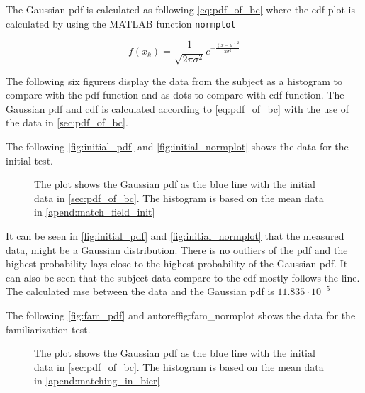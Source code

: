  The Gaussian \gls{pdf} is calculated as following \autoref{eq:pdf_of_bc} where the \gls{cdf} plot is calculated by using the MATLAB function \texttt{normplot}

\begin{equation}\label{eq:pdf_of_bc}
f(x_{k}) = \frac{1}{\sqrt{2 \pi \sigma^2}}e^{-\frac{(x-\mu)^2}{2\sigma^2}}
\end{equation}


The following six figurers display the data from the subject as a histogram to compare with the \gls{pdf} function and as dots to compare with \gls{cdf} function. The Gaussian \gls{pdf} and \gls{cdf} is calculated according to \autoref{eq:pdf_of_bc} with the use of the data in \autoref{sec:pdf_of_bc}.


The following \autoref{fig:initial_pdf} and \autoref{fig:initial_normplot} shows the data for the initial test.

 \begin{figure}[H]
	\centering
	
		\caption{The plot shows the Gaussian \gls{pdf} as the blue line with the initial data in \autoref{sec:pdf_of_bc}. The histogram is based on the mean data in \autoref{apend:match_field_init}}
		\label{fig:initial_pdf}
\end{figure}


It can be seen in \autoref{fig:initial_pdf} and \autoref{fig:initial_normplot} that the measured data, might be a Gaussian distribution. There is no outliers of the \gls{pdf} and the highest probability lays close to the highest probability of the Gaussian \gls{pdf}. It can also be seen that the subject data compare to the \gls{cdf} mostly follows the line. The calculated \gls{mse} between the data and the Gaussian \gls{pdf} is $11.835 \cdot 10^{-5}$

The following \autoref{fig:fam_pdf} and autoref{fig:fam_normplot}  shows the data for the familiarization test.

 \begin{figure}[H]
	\centering
	
		\caption{The plot shows the Gaussian  \gls{pdf} as the blue line with the initial data in \autoref{sec:pdf_of_bc}. The histogram is based on the mean data in \autoref{apend:matching_in_bier}}
		\label{fig:fam_pdf}
\end{figure}

